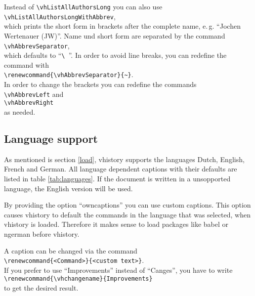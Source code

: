 Instead of \verb|\vhListAllAuthorsLong| you can also use\\
\mbox{}\hspace{2em}\verb|\vhListAllAuthorsLongWithAbbrev|,\\
which prints the short form in brackets after the complete name, e.\,g. ``Jochen Wertenauer (JW)''. Name und short form are separated by the command\\
\mbox{}\hspace{2em}\verb|\vhAbbrevSeparator|,\\
which defaults to ``\verb*|\ |''. In order to avoid line breaks, you can redefine the command with\\
\mbox{}\hspace{2em}\verb|\renewcommand{\vhAbbrevSeparator}{~}|.\\
In order to change the brackets you can redefine the commands\\
\mbox{}\hspace{2em}\verb|\vhAbbrevLeft| and\\
\mbox{}\hspace{2em}\verb|\vhAbbrevRight|\\
as needed.

\subsection{Language support}\label{languages}
As mentioned is section \ref{load}, vhistory supports the languages Dutch, English, French and German. All language dependent captions with their defaults are listed in table \ref{tab:languages}. If the document is written in a unsopported language, the English version will be used.

By providing the option ``owncaptions'' you can use custom captions. This option causes vhistory to default the commands in the language that was selected, when vhistory is loaded. Therefore it makes sense to load packages like babel or ngerman before vhistory.

A caption can be changed via the command\\
\mbox{}\hspace{2em}\verb|\renewcommand{<Command>}{<custom text>}|.\\
If you prefer to use ``Improvements'' instead of ``Canges'', you have to write\\
\mbox{}\hspace{2em}\verb|\renewcommand{\vhchangename}{Improvements}|\\
to get the desired result.

